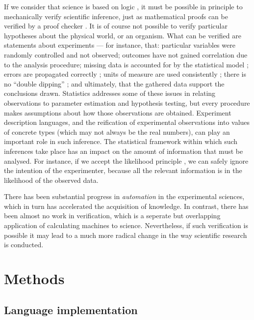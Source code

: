 If we consider that science is based on logic \citep{Jaynes2003}, it
must be possible in principle to mechanically verify scientific
inference, just as mathematical proofs can be verified by a proof
checker \citep{Harrison2009}. It is of course not possible to verify particular
hypotheses about the physical world, or an organism. What can be
verified are statements about experiments --- for instance, that:
particular variables were randomly controlled and not observed;
outcomes have not gained correlation due to the analysis procedure;
missing data is accounted for by the statistical model
\citep{Gelman2003}; errors are propagated correctly
\citep{Taylor1997}; units of measure are used consistently
\citep{Kennedy1997}; there is no ``double dipping''
\citep{Kriegeskorte2009}; and ultimately, that the gathered data
support the conclusions drawn. Statistics addresses some of these
issues in relating observations to parameter estimation and hypothesis
testing, but every procedure makes assumptions about how those
observations are obtained. Experiment description languages, and the
reification of experimental observations into values of concrete types
(which may not always be the real numbers), can play an
important role in such inference. The statistical framework within
which such inferences take place has an impact on the amount of
information that must be analysed. For instance, if we accept the
likelihood principle \citep{Jaynes2003}, we can safely ignore the
intention of the experimenter, because all the relevant information is
in the likelihood of the observed data. 

There has been substantial progress in \emph{automation} in the
experimental sciences, which in turn has accelerated the acquisition
of knowledge. In contrast, there has been almost no work in
verification, which is a seperate but overlapping application of
calculating machines to science. Nevertheless, if such verification is
possible it may lead to a much more radical change in the way
scientific research is conducted.

\section*{Methods}

\subsection*{Language implementation} 


